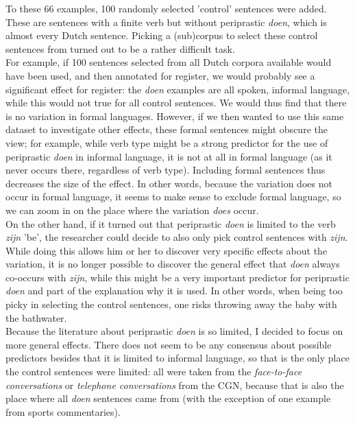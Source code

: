 \documentclass[12pt]{article}
\begin{document}
To these 66 examples, 100 randomly selected 'control' sentences were added. These are sentences with a finite verb but without periprastic \emph{doen}, which is almost every Dutch sentence. Picking a (sub)corpus to select these control sentences from turned out to be a rather difficult task. \\\indent
For example, if 100 sentences selected from all Dutch corpora available would have been used, and then annotated for register, we would probably see a significant effect for register: the \emph{doen} examples are all spoken, informal language, while this would not true for all control sentences. We would thus find that there is no variation in formal languages. However, if we then wanted to use this same dataset to investigate other effects, these formal sentences might obscure the view; for example, while verb type might be a strong predictor for the use of periprastic \emph{doen} in informal language, it is not at all in formal language (as it never occurs there, regardless of verb type). Including formal sentences thus decreases the size of the effect. In other words, because the variation does not occur in formal language, it seems to make sense to exclude formal language, so we can zoom in on the place where the variation \emph{does} occur. \\\indent 
On the other hand, if it turned out that periprastic \emph{doen} is limited to the verb \emph{zijn} 'be', the researcher could decide to also only pick control sentences with \emph{zijn}. While doing this allows him or her to discover very specific effects about the variation, it is no longer possible to discover the general effect that \emph{doen} always co-occurs with \emph{zijn}, while this might be a very important predictor for periprastic \emph{doen} and part of the explanation why it is used. In other words, when being too picky in selecting the control sentences, one risks throwing away the baby with the bathwater.\\\indent
Because the literature about periprastic \emph{doen} is so limited, I decided to focus on more general effects. There does not seem to be any consensus about possible predictors besides that it is limited to informal language, so that is the only place the control sentences were limited: all were taken from the \emph{face-to-face conversations} or \emph{telephone conversations} from the CGN, because that is also the place where all \emph{doen} sentences came from (with the exception of one example from sports commentaries).
\end{document}
